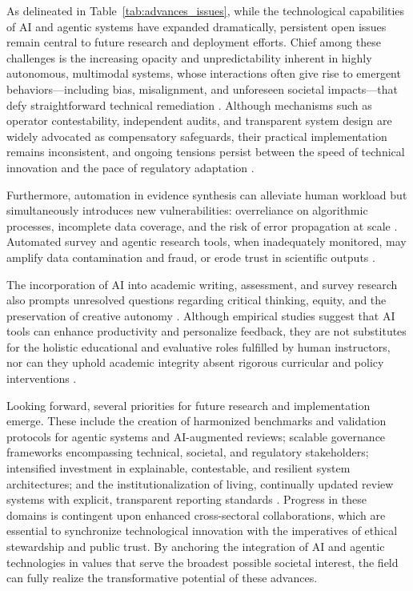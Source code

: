 \documentclass[11pt]{article}
\begin{document}
As delineated in Table~\ref{tab:advances_issues}, while the technological capabilities of AI and agentic systems have expanded dramatically, persistent open issues remain central to future research and deployment efforts. Chief among these challenges is the increasing opacity and unpredictability inherent in highly autonomous, multimodal systems, whose interactions often give rise to emergent behaviors—including bias, misalignment, and unforeseen societal impacts—that defy straightforward technical remediation \cite{95,96,100,110}. Although mechanisms such as operator contestability, independent audits, and transparent system design are widely advocated as compensatory safeguards, their practical implementation remains inconsistent, and ongoing tensions persist between the speed of technical innovation and the pace of regulatory adaptation \cite{97,98,100,106}.

Furthermore, automation in evidence synthesis can alleviate human workload but simultaneously introduces new vulnerabilities: overreliance on algorithmic processes, incomplete data coverage, and the risk of error propagation at scale \cite{74,80,84,102,104}. Automated survey and agentic research tools, when inadequately monitored, may amplify data contamination and fraud, or erode trust in scientific outputs \cite{89,90,91,92,93,94,95,96,97,98,100,101,105,106,113,114,115}.

The incorporation of AI into academic writing, assessment, and survey research also prompts unresolved questions regarding critical thinking, equity, and the preservation of creative autonomy \cite{86,87,88,89,90,91,92,93,94,101,114,115,117}. Although empirical studies suggest that AI tools can enhance productivity and personalize feedback, they are not substitutes for the holistic educational and evaluative roles fulfilled by human instructors, nor can they uphold academic integrity absent rigorous curricular and policy interventions \cite{87,89,92,94,114,115,117}.

Looking forward, several priorities for future research and implementation emerge. These include the creation of harmonized benchmarks and validation protocols for agentic systems and AI-augmented reviews; scalable governance frameworks encompassing technical, societal, and regulatory stakeholders; intensified investment in explainable, contestable, and resilient system architectures; and the institutionalization of living, continually updated review systems with explicit, transparent reporting standards \cite{74,75,80,84,95,97,98,100,102,104,106,109,110,113,114}. Progress in these domains is contingent upon enhanced cross-sectoral collaborations, which are essential to synchronize technological innovation with the imperatives of ethical stewardship and public trust. By anchoring the integration of AI and agentic technologies in values that serve the broadest possible societal interest, the field can fully realize the transformative potential of these advances.
\end{document}
